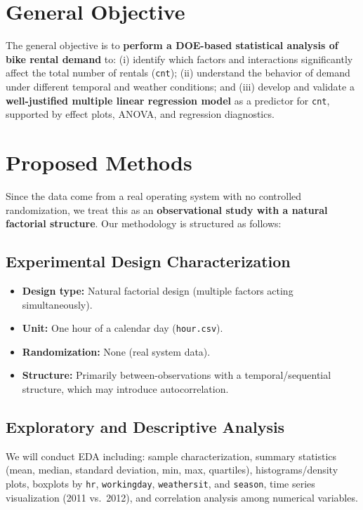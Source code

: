 \documentclass[12pt]{article}
\begin{document}
\section{General Objective}

The general objective is to \textbf{perform a DOE-based statistical analysis of bike rental demand} to: (i) identify which factors and interactions significantly affect the total number of rentals (\texttt{cnt}); (ii) understand the behavior of demand under different temporal and weather conditions; and (iii) develop and validate a \textbf{well-justified multiple linear regression model} as a predictor for \texttt{cnt}, supported by effect plots, ANOVA, and regression diagnostics.

\section{Proposed Methods}

Since the data come from a real operating system with no controlled randomization, we treat this as an \textbf{observational study with a natural factorial structure}. Our methodology is structured as follows:

\subsection{Experimental Design Characterization}
\begin{itemize}
\item \textbf{Design type:} Natural factorial design (multiple factors acting simultaneously).
\item \textbf{Unit:} One hour of a calendar day (\texttt{hour.csv}).
\item \textbf{Randomization:} None (real system data).
\item \textbf{Structure:} Primarily between-observations with a temporal/sequential structure, which may introduce autocorrelation.
\end{itemize}

\subsection{Exploratory and Descriptive Analysis}
We will conduct EDA including: sample characterization, summary statistics (mean, median, standard deviation, min, max, quartiles), histograms/density plots, boxplots by \texttt{hr}, \texttt{workingday}, \texttt{weathersit}, and \texttt{season}, time series visualization (2011 vs.\ 2012), and correlation analysis among numerical variables.
\end{document}
